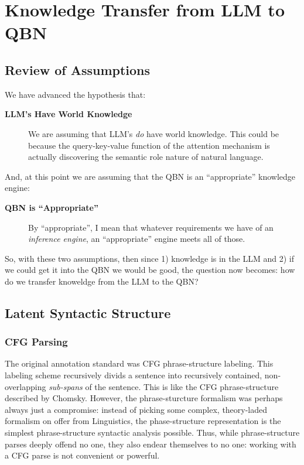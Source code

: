 \documentclass[12pt]{article}
\begin{document}
\section{Knowledge Transfer from LLM to QBN}
\subsection{Review of Assumptions}
We have advanced the hypothesis that:
\begin{description}
    \item[\textbf{LLM's Have World Knowledge}] We are assuming that LLM's {\em do} have world knowledge. This could be because the query-key-value function of the attention mechanism is actually discovering the semantic role nature of natural language.
  \end{description}

And, at this point we are assuming that the QBN is an ``appropriate'' knowledge engine:
\begin{description}
    \item[\textbf{QBN is ``Appropriate''}] By ``appropriate'', I mean that whatever requirements we have of an {\em inference engine}, an ``appropriate'' engine meets all of those.
  \end{description}

So, with these two assumptions, then since 1) knowledge is in the LLM and 2) if we could get it into the QBN we would be good, the question now becomes: how do we transfer knoweldge from the LLM to the QBN?

\subsection{Latent Syntactic Structure}
\subsubsection{CFG Parsing}
The original annotation standard was CFG phrase-structure labeling.
This labeling scheme recursively divids a sentence into recursively contained, non-overlapping {\em sub-spans} of the sentence.
This is like the CFG phrase-structure described by Chomsky.
However, the phrase-sturcture formalism was perhaps always just a compromise: instead of picking some complex, theory-laded formalism on offer from Linguistics, the phase-structure representation is the simplest phrase-structure syntactic analysis possible.
Thus, while phrase-structure parses deeply offend no one, they also endear themselves to no one: working with a CFG parse is not convenient or powerful.
\end{document}
